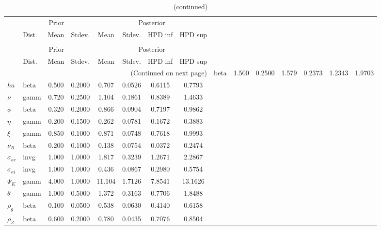  
\begin{center}
\begin{longtable}{llcccccc} 
\caption{Results from Metropolis-Hastings (parameters)}
 \label{Table:MHPosterior:1}\\
\toprule 
  & \multicolumn{3}{c}{Prior}  &  \multicolumn{4}{c}{Posterior} \\
  \cmidrule(r{.75em}){2-4} \cmidrule(r{.75em}){5-8}
  & Dist. & Mean  & Stdev. & Mean & Stdev. & HPD inf & HPD sup\\
\midrule \endfirsthead 
\caption{(continued)}\\\toprule 
  & \multicolumn{3}{c}{Prior}  &  \multicolumn{4}{c}{Posterior} \\
  \cmidrule(r{.75em}){2-4} \cmidrule(r{.75em}){5-8}
  & Dist. & Mean  & Stdev. & Mean & Stdev. & HPD inf & HPD sup\\
\midrule \endhead 
\bottomrule \multicolumn{8}{r}{(Continued on next page)} \endfoot 
\bottomrule \endlastfoot 
${\sigma}$ & beta &   1.500 & 0.2500 &   1.579& 0.2373 &  1.2343 &  1.9703 \\ 
${ha}$ & beta &   0.500 & 0.2000 &   0.707& 0.0526 &  0.6115 &  0.7793 \\ 
$\nu$ & gamm &   0.720 & 0.2500 &   1.104& 0.1861 &  0.8389 &  1.4633 \\ 
${\phi}$ & beta &   0.320 & 0.2000 &   0.866& 0.0904 &  0.7197 &  0.9862 \\ 
${\eta}$ & gamm &   0.200 & 0.1500 &   0.262& 0.0781 &  0.1672 &  0.3883 \\ 
$\xi$ & gamm &   0.850 & 0.1000 &   0.871& 0.0748 &  0.7618 &  0.9993 \\ 
${\nu_R}$ & beta &   0.200 & 0.1000 &   0.138& 0.0754 &  0.0372 &  0.2474 \\ 
${\sigma_{ac}}$ & invg &   1.000 & 1.0000 &   1.817& 0.3239 &  1.2671 &  2.2867 \\ 
${\sigma_{ai}}$ & invg &   1.000 & 1.0000 &   0.436& 0.0867 &  0.2980 &  0.5754 \\ 
${\Psi_{K}}$ & gamm &   4.000 & 1.0000 &  11.104& 1.7126 &  7.8541 & 13.1626 \\ 
${\theta}$ & gamm &   1.000 & 0.5000 &   1.372& 0.3163 &  0.7706 &  1.8488 \\ 
${\rho_g}$ & beta &   0.100 & 0.0500 &   0.538& 0.0630 &  0.4140 &  0.6158 \\ 
${\rho_Z}$ & beta &   0.600 & 0.2000 &   0.780& 0.0435 &  0.7076 &  0.8504 \\ 

\end{longtable}
\end{center}
